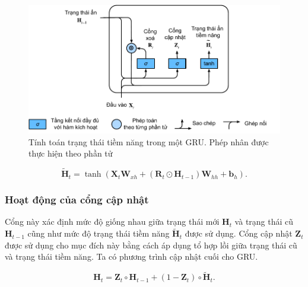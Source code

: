 \documentclass[conference]{IEEEtran}
\begin{document}
\begin{figure}[H]
    \centering
    \begin{minipage}{0.43\textwidth}
        \centering
        \includegraphics[width=1\textwidth]{bibliography/figure/GRU/gru_2.pdf}
        \caption{Tính toán trạng thái tiềm năng trong một GRU. Phép nhân được thực hiện theo phần tử}
        \label{fig:gru_del}
    \end{minipage}

\end{figure}

\begin{equation*}
    \tilde{\mathbf{H}}_t = \tanh (\mathbf{X}_t \mathbf{W}_{xh} + (\mathbf{R}_t \odot \mathbf{H}_{t-1}) \mathbf{W}_{hh} + \mathbf{b}_h).
\end{equation*}

\subsubsection{Hoạt động của cổng cập nhật}
Cổng này xác định mức độ giống nhau giữa trạng thái mới \(\mathbf{H}_t \) và trạng thái cũ \(\mathbf{H}_{t-1}\) cũng như mức độ trạng thái tiềm năng \(\widetilde{\mathbf{H}}_t\) được sử dụng. Cổng cập nhật \(\mathbf{Z}_t\) được sử dụng cho mục đích này bằng cách áp dụng tổ hợp lồi giữa trạng thái cũ và trạng thái tiềm năng. Ta có phương
trình cập nhật cuối cho GRU.

\begin{equation*}
    \mathbf{H}_t = \mathbf{Z}_t \circ \mathbf{H}_{t-1} + (1 - \mathbf{Z}_t) \circ \tilde{\mathbf{H}}_t.
\end{equation*}
\end{document}
